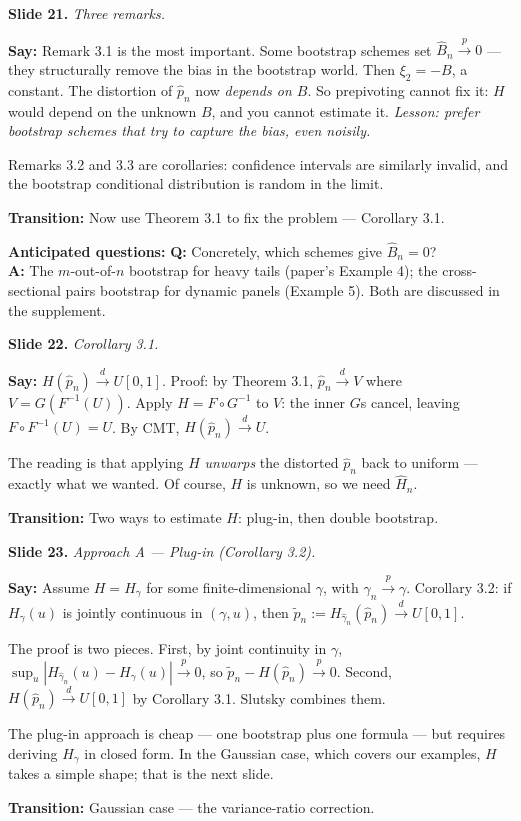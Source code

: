 \documentclass[11pt]{article}
\theoremstyle{definition}
\newcommand{\dto}{\xrightarrow{d}}
\newcommand{\pto}{\xrightarrow{p}}
\newcommand{\Bnh}{\hat{B}_{n}}
\newcommand{\pnh}{\hat{p}_{n}}
\newcommand{\pnt}{\tilde{p}_{n}}
\newcommand{\Hnh}{\hat{H}_{n}}
\newcommand{\slide}[2]{%
  \medskip
  \noindent\colorbox{soft}{\parbox{\linewidth}{\textbf{Slide #1.} \textit{#2}}}
  \medskip
}
\newcommand{\say}[1]{\textbf{Say:} #1}
\newcommand{\trans}[1]{\textbf{Transition:} #1}
\newcommand{\Q}[2]{\noindent\textcolor{warn}{\textbf{Q:}} #1\\ \textcolor{accent}{\textbf{A:}} #2\par\smallskip}
\begin{document}
\slide{21}{Three remarks.}
\say{Remark 3.1 is the most important. Some bootstrap schemes set $\Bnh\pto 0$ ---
they structurally remove the bias in the bootstrap world. Then $\xi_2=-B$, a
constant. The distortion of $\pnh$ now \emph{depends on $B$}. So
prepivoting cannot fix it: $H$ would depend on the unknown $B$, and you cannot
estimate it. \emph{Lesson: prefer bootstrap schemes that try to capture the bias,
even noisily.}

Remarks 3.2 and 3.3 are corollaries: confidence intervals are similarly
invalid, and the bootstrap conditional distribution is random in the limit.}

\trans{Now use Theorem 3.1 to fix the problem --- Corollary 3.1.}

\textbf{Anticipated questions:}
\Q{Concretely, which schemes give $\Bnh=0$?}
{The $m$-out-of-$n$ bootstrap for heavy tails (paper's Example 4); the
cross-sectional pairs bootstrap for dynamic panels (Example 5). Both are
discussed in the supplement.}

\slide{22}{Corollary 3.1.}
\say{$H(\pnh)\dto U[0,1]$. Proof: by Theorem 3.1, $\pnh\dto V$ where
$V=G(F^{-1}(U))$. Apply $H=F\circ G^{-1}$ to $V$: the inner $G$s cancel,
leaving $F\circ F^{-1}(U)=U$. By CMT, $H(\pnh)\dto U$.

The reading is that applying $H$ \emph{unwarps} the distorted $\pnh$ back to
uniform --- exactly what we wanted. Of course, $H$ is unknown, so we need
$\Hnh$.}

\trans{Two ways to estimate $H$: plug-in, then double bootstrap.}

\slide{23}{Approach A --- Plug-in (Corollary 3.2).}
\say{Assume $H=H_\gamma$ for some finite-dimensional $\gamma$, with $\hat\gamma_n
\pto\gamma$. Corollary 3.2: if $H_\gamma(u)$ is jointly continuous in $(\gamma,u)$,
then $\pnt:=H_{\hat\gamma_n}(\pnh)\dto U[0,1]$.

The proof is two pieces. First, by joint continuity in $\gamma$,
$\sup_u|H_{\hat\gamma_n}(u)-H_\gamma(u)|\pto 0$, so $\pnt-H(\pnh)\pto 0$.
Second, $H(\pnh)\dto U[0,1]$ by Corollary 3.1. Slutsky combines them.

The plug-in approach is cheap --- one bootstrap plus one formula --- but
requires deriving $H_\gamma$ in closed form. In the Gaussian case, which
covers our examples, $H$ takes a simple shape; that is the next slide.}

\trans{Gaussian case --- the variance-ratio correction.}
\end{document}
